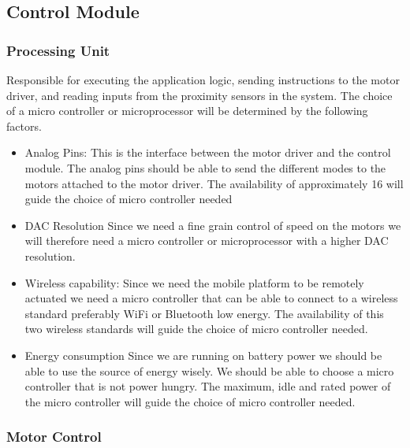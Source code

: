 \subsection{Control Module}

\subsubsection{Processing Unit}

Responsible for executing the application logic, sending instructions to the motor driver, and reading inputs from the proximity sensors in the system.
The choice of a micro controller or microprocessor will be determined by the following factors.

\begin{itemize}
    \item Analog Pins:
    This is the interface between the motor driver and the control module.
    The analog pins should be able to send the different modes to the motors attached to the motor driver.
    The availability of approximately 16 will guide the choice of micro controller needed
    
    \item \ac{DAC} Resolution
    Since we need a fine grain control of speed on the motors we will therefore need a micro controller or microprocessor with a higher \ac{DAC} resolution.
    
    \item Wireless capability: 
    Since we need the mobile platform to be remotely actuated we need a micro controller that can be able to connect to a wireless standard preferably WiFi or Bluetooth low energy.
    The availability of this two wireless standards will guide the choice of micro controller needed.
    
    \item Energy consumption
    Since we are running on battery power we should be able to use the source of energy wisely.
    We should be able to choose a micro controller that is not power hungry.
    The maximum, idle and rated power of the micro controller will guide the choice of micro controller needed.
    
\end{itemize}

\subsubsection{Motor Control}

